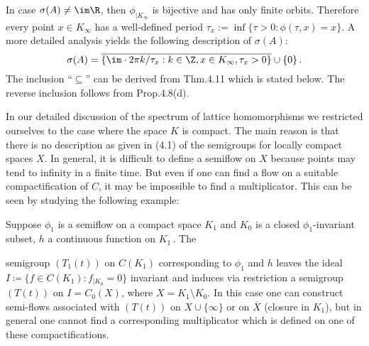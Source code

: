 \begin{remark}\label{rem:b3-4.10}
	In case $\sigma(A) \neq \im\R$, then $\phi_{|K_{\infty}}$ is bijective and has only finite orbits.
	Therefore every point $x \in K_{\infty}$ has a well-defined period $\tau_{x} := \inf\{\tau > 0 : \phi(\tau,x) = x\}$.
	A more detailed analysis yields the following description of $\sigma(A)$:
	\begin{equation}\label{eq:b3-4.16}
		\sigma(A) = \overline{\{\im \cdot 2\pi k/\tau_{x} : k \in \Z, x \in K_{\infty}, \tau_{x} > 0\}} \cup \{0\}\,.
	\end{equation}
	The inclusion \enquote{$\subseteq$} can be derived from Thm.4.11 which is stated below.
	The reverse inclusion follows from Prop.4.8(d).
	
	In our detailed discussion of the spectrum of lattice homomorphisms we restricted ourselves to the case where the space $K$ is compact.
	The main reason is that there is no description as given in (4.1) of the semigroups for locally compact spaces $X$.
	In general, it is difficult to define a semiflow on $X$ because points may tend to infinity in a finite time.
	But even if one can find a flow on a suitable compactification of $C$, it may be impossible to find a multiplicator.
	This can be seen by studying the following example:
	
	Suppose $\phi_{1}$ is a semiflow on a compact space $K_{1}$ and $K_{0}$ is a closed $\phi_{1}$-invariant subset, $h$ a continuous function on $K_{1}$\,. The
\end{remark}
%
semigroup $(T_{1}(t))$ on $C(K_{1})$ corresponding to $\phi_{1}$ and $h$ leaves the ideal $I \coloneq \{f \in C(K_{1}) : f_{|K_{0}} = 0\}$ invariant and induces via restriction a semigroup $(T(t))$ on $I = C_{0}(X)$, where $X = K_{1} \setminus K_{0}$.
In this case one can construct semi-flows associated with $(T(t))$ on $X\cup\{\infty\}$ or on $\overline{X}$ (closure in $K_{1}$), but in general one cannot find a corresponding multiplicator which is defined on one of these compactifications.

